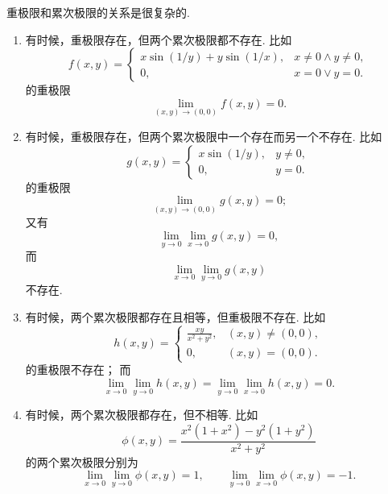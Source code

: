 \begin{example}
重极限和累次极限的关系是很复杂的.
\begin{enumerate}
	\item 有时候，重极限存在，但两个累次极限都不存在.
	比如\[
		f(x,y) = \left\{ \begin{array}{cl}
			x \sin(1/y) + y \sin(1/x), & x\neq0 \land y\neq0, \\
			0, & x=0 \lor y=0.
		\end{array} \right.
	\]的重极限\[
		\lim_{(x,y)\to(0,0)} f(x,y) = 0.
	\]

	\item 有时候，重极限存在，但两个累次极限中一个存在而另一个不存在.
	比如\[
		g(x,y) = \left\{ \begin{array}{cl}
			x \sin(1/y), & y\neq0, \\
			0, & y=0.
		\end{array} \right.
	\]的重极限\[
		\lim_{(x,y)\to(0,0)} g(x,y) = 0;
	\]
	又有\[
		\lim_{y\to0} \lim_{x\to0} g(x,y) = 0,
	\]
	而\[
		\lim_{x\to0} \lim_{y\to0} g(x,y)
	\]不存在.

	\item 有时候，两个累次极限都存在且相等，但重极限不存在.
	比如\[
		h(x,y) = \left\{ \begin{array}{cl}
			\frac{xy}{x^2+y^2}, & (x,y)\neq(0,0), \\
			0, & (x,y)=(0,0).
		\end{array} \right.
	\]的重极限不存在；
	而\[
		\lim_{x\to0} \lim_{y\to0} h(x,y)
		= \lim_{y\to0} \lim_{x\to0} h(x,y) = 0.
	\]

	\item 有时候，两个累次极限都存在，但不相等.
	比如\[
		\phi(x,y) = \frac{x^2(1+x^2) - y^2(1+y^2)}{x^2+y^2}
	\]的两个累次极限分别为\[
		\lim_{x\to0} \lim_{y\to0} \phi(x,y) = 1,
		\qquad
		\lim_{y\to0} \lim_{x\to0} \phi(x,y) = -1.
	\]
\end{enumerate}
\end{example}

